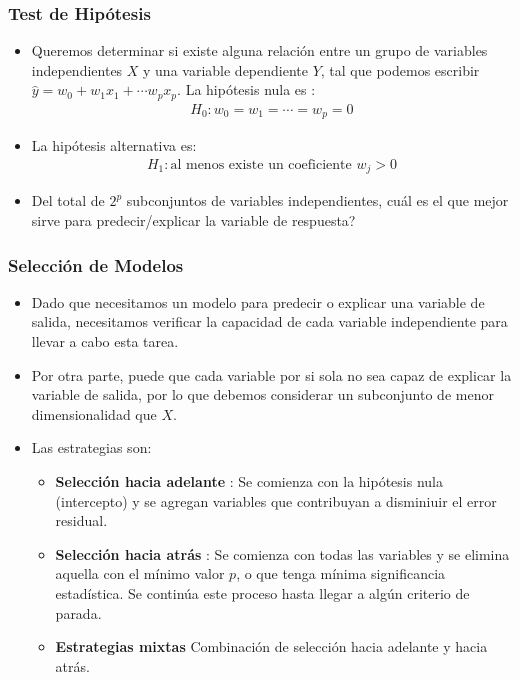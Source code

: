 \documentclass[aspectratio=169, 10pt]{beamer}
\begin{document}
\begin{frame}
\frametitle{Test de Hip\'otesis}
\begin{itemize}
\item Queremos determinar si existe alguna relaci\'on entre un grupo de variables independientes $X$ y una variable dependiente $Y$, tal que podemos escribir $\hat y=w_0+w_1 x_1 + \cdots w_p x_p$. La hip\'otesis nula es :
\begin{align*}
H_0 : w_0=w_1=\cdots=w_p=0
\end{align*}
\pause
\item La hip\'otesis alternativa es:
\begin{align*}
H_1 : \text{al menos existe un coeficiente } w_j>0 
\end{align*}
\pause
\item  Del total de $2^p$ subconjuntos de variables independientes, cu\'al es el que mejor sirve para predecir/explicar la variable de respuesta?
\end{itemize}
\end{frame}

\begin{frame}
\frametitle{Selecci\'on de Modelos}
\begin{itemize}
\item Dado que necesitamos un modelo para predecir o explicar una variable de salida, necesitamos verificar la capacidad de cada variable independiente para llevar a cabo esta tarea. 
\pause
\item Por otra parte, puede que cada variable por si sola no sea capaz de explicar la variable de salida, por lo que debemos considerar un subconjunto de menor dimensionalidad que $X$.  
\pause
\item Las estrategias son:
\begin{itemize}
\item \textbf{Selecci\'on hacia adelante} : Se comienza con la hip\'otesis nula (intercepto) y se agregan variables que contribuyan a disminiuir el error residual.

\item \textbf{Selecci\'on hacia atr\'as} : Se comienza con todas las variables y se elimina aquella con el m\'inimo valor $p$, o que tenga m\'inima significancia estad\'istica. Se contin\'ua este proceso hasta llegar a alg\'un criterio de parada.

\item \textbf{Estrategias mixtas} Combinaci\'on de selecci\'on hacia adelante y hacia atr\'as.
\end{itemize}
 
\end{itemize}
\end{frame}
\end{document}
